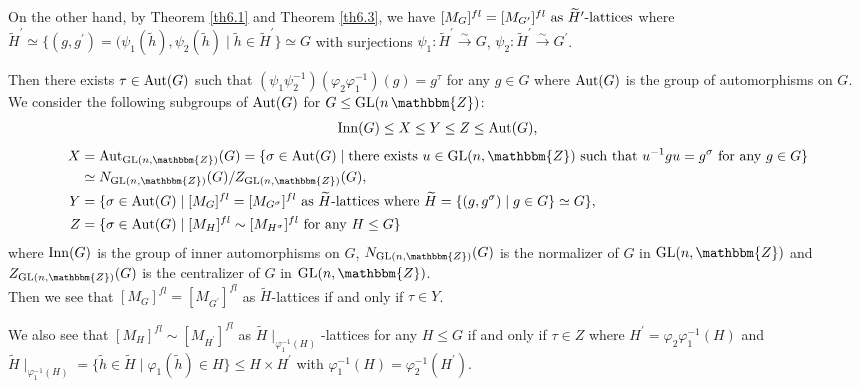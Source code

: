 \documentclass{amsart}
\theoremstyle{plain}
\theoremstyle{definition}
\theoremstyle{remark}
\newcommand{\bZ}{\mathbbm{Z}}\newcommand{\bQ}{\mathbbm{Q}}
\newcommand{\GL}{{\rm GL}}\newcommand{\SL}{{\rm SL}}
\newcounter{sub}\def\tr{\mbox{tr }}
\begin{document}
{{On the other hand, 
by Theorem \ref{th6.1} and Theorem \ref{th6.3}, 
we have  $[M_G]^{fl}=[M_{G^\prime}]^{fl}\ {\rm as}\ 
\widetilde{H}^\prime\textrm{-lattices}$ where $\widetilde{H}^\prime\simeq \{(g,g^\prime)=(\psi_1(\widetilde{h}),\psi_2(\widetilde{h})\mid \widetilde{h}\in \widetilde{H}^\prime\}\simeq G$ with surjections 
$\psi_1:\widetilde{H}^\prime\xrightarrow{\sim} G$, 
$\psi_2:\widetilde{H}^\prime\xrightarrow{\sim} G^\prime$. 

Then 
there exists $\tau\in {\rm Aut}(G)$ such that 
$(\psi_1\psi_2^{-1})(\varphi_2\varphi_1^{-1})(g)=g^\tau$ 
for any $g\in G$ where 
${\rm Aut}(G)$ is the group of automorphisms on $G$.
\\

We consider the following subgroups of ${\rm Aut}(G)$ for 
$G\leq {\rm GL}(n\,\bZ)$: 
\begin{align*}
{\rm Inn}(G)\leq X\leq Y\leq Z\leq {\rm Aut}(G),
\end{align*}
\begin{align*}
X&={\rm Aut}_{\GL(n,\bZ)}(G)=
\{\sigma\in{\rm Aut}(G)\mid 
{\rm there}\ {\rm exists}\ u\in {\rm GL}(n,\bZ)\ {\rm such}\ {\rm that}\ 
u^{-1}gu=g^\sigma\ {\rm for}\ {\rm any}\ g\in G\}\\
&\simeq N_{\GL(n,\bZ)}(G)/Z_{\GL(n,\bZ)}(G),\\
Y&=\{\sigma\in{\rm Aut}(G)\mid [M_G]^{fl}=[M_{G^\sigma}]^{fl}\ {\rm as}\ 
\widetilde{H}\textrm{-lattices}\ {\rm where}\ \widetilde{H}=\{(g,g^\sigma)\mid g\in G\}\simeq G\},\\
Z&=\{\sigma\in{\rm Aut}(G)\mid [M_H]^{fl}\sim [M_{H^\sigma}]^{fl}\ {\rm for}\ {\rm any}\ H\leq G\}
\end{align*} 
where 
${\rm Inn}(G)$ is the group of inner automorphisms on $G$, 
$N_{\GL(n,\bZ)}(G)$ is the normalizer of $G$ in $\GL(n,\bZ)$ and 
$Z_{\GL(n,\bZ)}(G)$ is the centralizer of $G$ in $\GL(n,\bZ)$.\\ 

Then we see that 
$[M_G]^{fl}=[M_{G^\prime}]^{fl}$ as $\widetilde{H}$-lattices 
if and only if $\tau \in Y$. 

We also see that 
$[M_H]^{fl}\sim [M_{H^\prime}]^{fl}$ 
as $\widetilde{H}\mid_{\varphi_1^{-1}(H)}$-lattices 
for any $H\leq G$ 
if and only if $\tau\in Z$ 
where $H^\prime=\varphi_2\varphi_1^{-1}(H)$
and 
$\widetilde{H}\mid_{\varphi_1^{-1}(H)}
=\{\widetilde{h}\in\widetilde{H}\mid \varphi_1(\widetilde{h})\in H\}\leq 
H\times H^\prime$ 
with $\varphi_1^{-1}(H)=\varphi_2^{-1}(H^\prime)$.\\

}}
\end{document}
